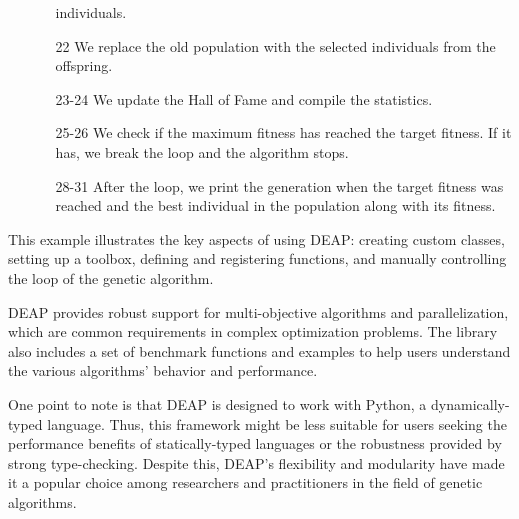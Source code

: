 \begin{enumerate}
\begin{enumerate}
          individuals.
        \item[22] We replace the old population with the selected individuals
          from the offspring.
        \item[23-24] We update the Hall of Fame and compile the statistics.
        \item[25-26] We check if the maximum fitness has reached the target
          fitness.
          If it has, we break the loop and the algorithm stops.
        \item[28-31] After the loop, we print the generation when the target
          fitness was reached and the best individual in the population along with
          its fitness.
      \end{enumerate}
  \end{enumerate}

  This example illustrates the key aspects of using DEAP: creating custom classes, setting up a toolbox, defining and registering functions, and manually controlling the loop of the genetic algorithm.

  DEAP provides robust support for multi-objective algorithms and
  parallelization, which are common requirements in complex optimization
  problems.
  The library also includes a set of benchmark functions and examples to help
  users understand the various algorithms' behavior and performance.


  One point to note is that DEAP is designed to work with Python, a
  dynamically-typed language.
  Thus, this framework might be less suitable for users seeking the performance
  benefits of statically-typed languages or the robustness provided by strong
  type-checking.
  Despite this, DEAP's flexibility and modularity have made it a popular choice
  among researchers and practitioners in the field of genetic algorithms.
